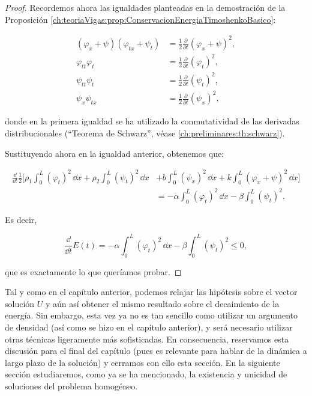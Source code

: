 \begin{proof}
    Recordemos ahora las igualdades planteadas en la demostración de la Proposición \ref{ch:teoriaVigas:prop:ConservacionEnergiaTimoshenkoBasico}:

    \begin{align*}
        (\varphi_x + \psi)(\varphi_{tx} + \psi_t) &= \frac{1}{2}\frac{\partial}{\partial t}(\varphi_x + \psi)^2,\\
        \varphi_{tt}\varphi_t &= \frac{1}{2}\frac{\partial}{\partial t}(\varphi_t)^2,\\
        \psi_{tt}\psi_t &= \frac{1}{2}\frac{\partial}{\partial t}(\psi_t)^2,\\
        \psi_x \psi_{tx} &= \frac{1}{2}\frac{\partial}{\partial t}(\psi_x)^2,
    \end{align*}

    donde en la primera igualdad se ha utilizado la conmutatividad de las derivadas distribucionales (``Teorema de Schwarz'', véase \ref{ch:preliminares:th:schwarz}). 

    Sustituyendo ahora en la igualdad anterior, obtenemos que:

    \begin{align*}
        \frac{\dd}{\dd t}\frac{1}{2}\Bigg[\rho_1 \int_0^L (\varphi_t)^2\, \dd x + \rho_2 \int_0^L(\psi_t)^2 \, \dd x &+ b\int_0^L (\psi_x)^2 \, \dd x + k \int_0^L (\varphi_x + \psi)^2 \, \dd x\Bigg]\\
        &= -\alpha\int_0^L(\varphi_t)^2 \, \dd x - \beta\int_0^L (\psi_t)^2.
    \end{align*}

    Es decir,

    \[\frac{\dd}{\dd t}E(t) = -\alpha\int_0^L(\varphi_t)^2 \, \dd x - \beta\int_0^L (\psi_t)^2 \leq 0,\]

    que es exactamente lo que queríamos probar.
\end{proof}

Tal y como en el capítulo anterior, podemos relajar las hipótesis sobre el vector solución $U$ y aún así obtener el mismo resultado sobre el decaimiento de la energía. Sin embargo, esta vez ya no es tan sencillo como utilizar un argumento de densidad (así como se hizo en el capítulo anterior), y será necesario utilizar otras técnicas ligeramente más sofisticadas. En consecuencia, reservamos esta discusión para el final del capítulo (pues es relevante para hablar de la dinámica a largo plazo de la solución) y cerramos con ello esta sección. En la siguiente sección estudiaremos, como ya se ha mencionado, la existencia y unicidad de soluciones del problema homogéneo.

